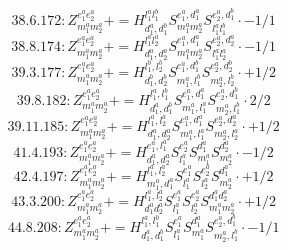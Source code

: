 \documentclass[letterpaper,10pt,fleqn,leqno,onecolumn]{article}
\begin{document}
\begin{equation} \;\;\;\;\;\;  38.6.172: Z^{e_{1}^{a}e_{2}^{a}}_{m_{1}^{a}m_{2}^{a}}+=H^{l_{1}^{a}l_{1}^{b}}_{d_{1}^{a},d_{1}^{b}}S^{e_{1}^{a},d_{1}^{a}}_{m_{1}^{a}m_{2}^{a}}S^{e_{2}^{a},d_{1}^{b}}_{l_{1}^{a}l_{1}^{b}}\cdot -1/1 \end{equation}
\begin{equation} \;\;\;\;\;\;  38.8.174: Z^{e_{1}^{a}e_{2}^{a}}_{m_{1}^{a}m_{2}^{a}}+=H^{l_{1}^{a}l_{2}^{a}}_{d_{1}^{a},d_{2}^{a}}S^{e_{1}^{a},d_{1}^{a}}_{m_{1}^{a}m_{2}^{a}}S^{e_{2}^{a},d_{2}^{a}}_{l_{1}^{a}l_{2}^{a}}\cdot -1/1 \end{equation}
\begin{equation} \;\;\;\;\;\;  39.3.177: Z^{e_{1}^{a}e_{2}^{a}}_{m_{1}^{a}m_{2}^{a}}+=H^{l_{1}^{b},l_{2}^{b}}_{d_{1}^{b},d_{2}^{b}}S^{e_{1}^{a},d_{1}^{b}}_{m_{1}^{a},l_{1}^{b}}S^{e_{2}^{a},d_{2}^{b}}_{m_{2}^{a},l_{2}^{b}}\cdot +1/2 \end{equation}
\begin{equation} \;\;\;\;\;\;  39.8.182: Z^{e_{1}^{a}e_{2}^{a}}_{m_{1}^{a}m_{2}^{a}}+=H^{l_{1}^{a},l_{1}^{b}}_{d_{1}^{a},d_{1}^{b}}S^{e_{1}^{a},d_{1}^{a}}_{m_{1}^{a},l_{1}^{a}}S^{e_{2}^{a},d_{1}^{b}}_{m_{2}^{a},l_{1}^{b}}\cdot 2/2 \end{equation}
\begin{equation} \;\;\;\;\;\;  39.11.185: Z^{e_{1}^{a}e_{2}^{a}}_{m_{1}^{a}m_{2}^{a}}+=H^{l_{1}^{a},l_{2}^{a}}_{d_{1}^{a},d_{2}^{a}}S^{e_{1}^{a},d_{1}^{a}}_{m_{1}^{a},l_{1}^{a}}S^{e_{2}^{a},d_{2}^{a}}_{m_{2}^{a},l_{2}^{a}}\cdot +1/2 \end{equation}
\begin{equation} \;\;\;\;\;\;  41.4.193: Z^{e_{1}^{a}e_{2}^{a}}_{m_{1}^{a}m_{2}^{a}}+=H^{e_{1}^{a},l_{1}^{a}}_{d_{1}^{a},d_{2}^{a}}S^{e_{2}^{a}}_{l_{1}^{a}}S^{d_{1}^{a}}_{m_{1}^{a}}S^{d_{2}^{a}}_{m_{2}^{a}}\cdot -1/2 \end{equation}
\begin{equation} \;\;\;\;\;\;  42.4.197: Z^{e_{1}^{a}e_{2}^{a}}_{m_{1}^{a}m_{2}^{a}}+=H^{l_{1}^{a},l_{2}^{a}}_{m_{1}^{a},d_{1}^{a}}S^{e_{1}^{a}}_{l_{1}^{a}}S^{e_{2}^{a}}_{l_{2}^{a}}S^{d_{1}^{a}}_{m_{2}^{a}}\cdot +1/2 \end{equation}
\begin{equation} \;\;\;\;\;\;  43.3.200: Z^{e_{1}^{a}e_{2}^{a}}_{m_{1}^{a}m_{2}^{a}}+=H^{l_{1}^{a},l_{2}^{a}}_{d_{1}^{a}d_{2}^{a}}S^{e_{1}^{a}}_{l_{1}^{a}}S^{e_{2}^{a}}_{l_{2}^{a}}S^{d_{1}^{a}d_{2}^{a}}_{m_{1}^{a}m_{2}^{a}}\cdot +1/2 \end{equation}
\begin{equation} \;\;\;\;\;\;  44.8.208: Z^{e_{1}^{a}e_{2}^{a}}_{m_{1}^{a}m_{2}^{a}}+=H^{l_{1}^{a},l_{1}^{b}}_{d_{1}^{a},d_{1}^{b}}S^{e_{1}^{a}}_{l_{1}^{a}}S^{d_{1}^{a}}_{m_{1}^{a}}S^{e_{2}^{a},d_{1}^{b}}_{m_{2}^{a},l_{1}^{b}}\cdot -1/1 \end{equation}
\end{document}
